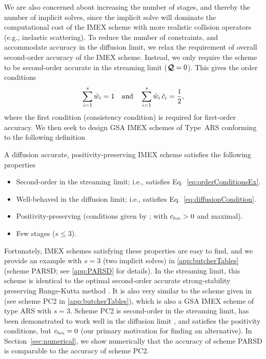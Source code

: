 We are also concerned about increasing the number of stages, and thereby the number of implicit solves, since the implicit solve will dominate the computational cost of the IMEX scheme with more realistic collision operators (e.g., inelastic scattering).  
To reduce the number of constraints, and accommodate accuracy in the diffusion limit, we relax the requirement of overall second-order accuracy of the IMEX scheme.  
Instead, we only require the scheme to be second-order accurate in the streaming limit ($\boldsymbol{\mathcal{Q}}=0$).  
This gives the order conditions
\begin{equation}
  \sum_{i=1}^{s}\tilde{w}_{i}=1
  \quad\text{and}\quad
  \sum_{i=1}^{s}\tilde{w}_{i}\,\tilde{c}_{i}=\frac{1}{2},
  \label{eq:orderConditionsEx}
\end{equation}
where the first condition (consistency condition) is required for first-order accuracy.  
We then seek to design GSA IMEX schemes of Type~ARS conforming to the following definition
\begin{define}
  A diffusion accurate, positivity-preserving IMEX scheme satisfies the following properties
  \begin{itemize}
    \item Second-order in the streaming limit; i.e., satisfies Eq.~\eqref{eq:orderConditionsEx}.
    \item Well-behaved in the diffusion limit; i.e., satisfies Eq.~\eqref{eq:diffusionCondition}.
    \item Positivity-preserving (conditions given by \cite{hu_etal_2018}; with $c_{\mbox{\tiny Sch}}>0$ and maximal).
    \item Few stages ($s\le3$).
  \end{itemize}
  \label{def:DIMEXP}
\end{define}
Fortunately, IMEX schemes satisfying these properties are easy to find, and we provide an example with $s=3$ (two implicit solves) in \ref{app:butcherTables} (scheme PARSD; see \ref{app:PARSD} for details).  
In the streaming limit, this scheme is identical to the optimal second-order accurate strong-stability preserving Runge-Kutta method \cite{gottlieb_etal_2001}.  
It is also very similar to the scheme given in \cite{mcclarren_etal_2008} (see scheme PC2 in \ref{app:butcherTables}), which is also a GSA IMEX scheme of type ARS with $s=3$.  
Scheme PC2 is second-order in the streaming limit, has been demonstrated to work well in the diffusion limit \cite{mcclarren_etal_2008,radice_etal_2013}, and satisfies the positivity conditions, but $c_{\mbox{\tiny Sch}}=0$ (our primary motivation for finding an alternative).  
In Section~\ref{sec:numerical}, we show numerically that the accuracy of scheme PARSD is comparable to the accuracy of scheme PC2.  

